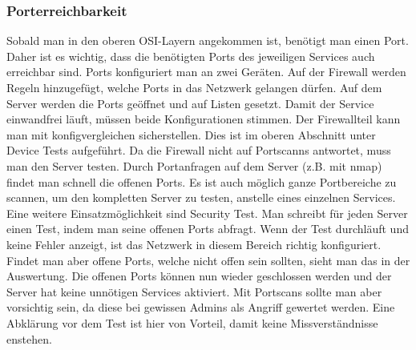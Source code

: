 \documentclass[a4,12pt]{scrartcl}
\begin{document}
\subsubsection{Porterreichbarkeit}
Sobald man in den oberen OSI-Layern angekommen ist, benötigt man einen Port. Daher ist es wichtig, dass die benötigten Ports des jeweiligen Services auch erreichbar sind.\newline\newline
Ports konfiguriert man an zwei Geräten. Auf der Firewall werden Regeln hinzugefügt, welche Ports in das Netzwerk gelangen dürfen. Auf dem Server werden die Ports geöffnet und auf Listen gesetzt. Damit der Service einwandfrei läuft, müssen beide Konfigurationen stimmen. Der Firewallteil kann man mit konfigvergleichen sicherstellen. Dies ist im oberen Abschnitt unter Device Tests aufgeführt.\newline\newline
Da die Firewall nicht auf Portscanns antwortet, muss man den Server testen. Durch Portanfragen auf dem Server (z.B. mit nmap) findet man schnell die offenen Ports. Es ist auch möglich ganze Portbereiche zu scannen, um den kompletten Server zu testen, anstelle eines einzelnen Services.\\ \newline\newline
Eine weitere Einsatzmöglichkeit sind Security Test. Man schreibt für jeden Server einen Test, indem man seine offenen Ports abfragt. Wenn der Test durchläuft und keine Fehler anzeigt, ist das Netzwerk in diesem Bereich richtig konfiguriert. Findet man aber offene Ports, welche nicht offen sein sollten, sieht man das in der Auswertung. Die offenen Ports können nun wieder geschlossen werden und der Server hat keine unnötigen Services aktiviert.\newline\newline
Mit Portscans sollte man aber vorsichtig sein, da diese bei gewissen Admins als Angriff gewertet werden. Eine Abklärung vor dem Test ist hier von Vorteil, damit keine Missverständnisse enstehen.
\end{document}
